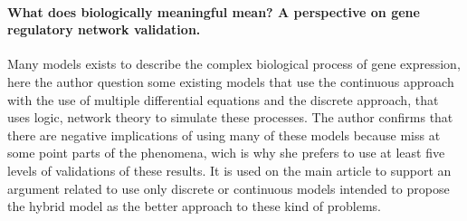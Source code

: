 \documentclass{article}
\begin{document}
\paragraph{What does biologically meaningful mean? A perspective on gene regulatory network validation.\cite{albertha_jm_walhout_what_2011}}

Many models exists to describe the complex biological process of gene expression, here the author question some existing models that use the continuous approach with the use of multiple differential equations and the discrete approach, that uses logic, network theory to simulate these processes. The author confirms that there are negative implications of using many of these models because miss at some point parts of the phenomena, wich is why she prefers to use at least five levels of validations of these results. It is used on the main article to support an argument related to use only discrete or continuous models intended to propose the hybrid model as the better approach to these kind of problems.



\end{document}

